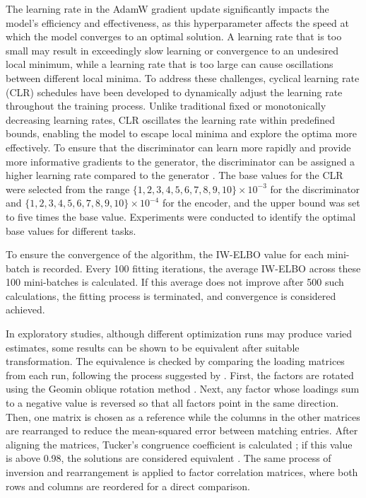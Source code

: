 \documentclass[a4paper,12pt]{article}
\theoremstyle{plain} %
\theoremstyle{remark} %
\theoremstyle{definition} %
\begin{document}
The learning rate in the AdamW gradient update significantly impacts the model's efficiency and effectiveness, as this hyperparameter affects the speed at which the model converges to an optimal solution. A learning rate that is too small may result in exceedingly slow learning or convergence to an undesired local minimum, while a learning rate that is too large can cause oscillations between different local minima. To address these challenges, cyclical learning rate (CLR) schedules \citep{smith2017cyclical} have been developed to dynamically adjust the learning rate throughout the training process. Unlike traditional fixed or monotonically decreasing learning rates, CLR oscillates the learning rate within predefined bounds, enabling the model to escape local minima and explore the optima more effectively. To ensure that the discriminator can learn more rapidly and provide more informative gradients to the generator, the discriminator can be assigned a higher learning rate compared to the generator \citep{heusel2017gans}. The base values for the CLR were selected from the range $\{1,2,3,4,5,6,7,8,9,10\} \times 10^{-3}$ for the discriminator and $\{1,2,3,4,5,6,7,8,9,10\} \times 10^{-4}$ for the encoder, and the upper bound was set to five times the base value. Experiments were conducted to identify the optimal base values for different tasks.

To ensure the convergence of the algorithm, the IW-ELBO value for each mini-batch is recorded. Every 100 fitting iterations, the average IW-ELBO across these 100 mini-batches is calculated. If this average does not improve after 500 such calculations, the fitting process is terminated, and convergence is considered achieved.

In exploratory studies, although different optimization runs may produce varied estimates, some results can be shown to be equivalent after suitable transformation. The equivalence is checked by comparing the loading matrices from each run, following the process suggested by \citet{urban2021deep}. First, the factors are rotated using the Geomin oblique rotation method \citep{yates1987multivariate}. Next, any factor whose loadings sum to a negative value is reversed \citep{asparouhov2009exploratory} so that all factors point in the same direction. Then, one matrix is chosen as a reference while the columns in the other matrices are rearranged to reduce the mean-squared error between matching entries. After aligning the matrices, Tucker’s congruence coefficient is calculated \citep{lorenzo2006tucker}; if this value is above 0.98, the solutions are considered equivalent \citep{maccallum1999sample}. The same process of inversion and rearrangement is applied to factor correlation matrices, where both rows and columns are reordered for a direct comparison.
\end{document}
